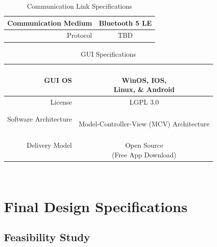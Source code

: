 \documentclass[12pt]{article}
\begin{document}
\begin{multicols}{2}
\begin{table}
\centering
\caption{Communication Link Specifications}
\begin{tabular} {| r | c | }
\hline
\parbox{0.45\linewidth}{\raggedleft Communication Medium \\[0.4em]} &  \parbox{0.48\linewidth}{\centering Bluetooth 5 LE}\\
\hline
\parbox{0.45\linewidth}{\raggedleft Protocol} &  \parbox{0.48\linewidth}{\centering TBD}\\
\hline
\end{tabular}
\end{table}


\begin{table}
\centering
\caption{GUI Specifications}
\begin{tabular} {| r | c | }
\hline
\parbox{0.45\linewidth}{\raggedleft GUI OS} & \parbox{0.48\linewidth}{\centering \hfill \\ WinOS, IOS, \\ Linux, \& Android}\\[0.4em]
\hline
\parbox{0.45\linewidth}{\raggedleft License} &    \parbox{0.48\linewidth}{\centering LGPL 3.0} \\
\hline
\parbox{0.45\linewidth}{\raggedleft Software Architecture} &   \parbox{0.48\linewidth}{\centering \hfill \\ Model-Controller-View (MCV) Architecture\\[0.4em]} \\
\hline
\parbox{0.45\linewidth}{\raggedleft Delivery Model} &   \parbox{0.48\linewidth}{\centering \hfill \\ Open Source \\ (Free App Download)} \\[0.4em]
\hline
\end{tabular}
\end{table}
 \hfill \\
 \vfill 

\end{multicols}

\section{Final Design Specifications}
\subsection{Feasibility Study}
\end{document}
